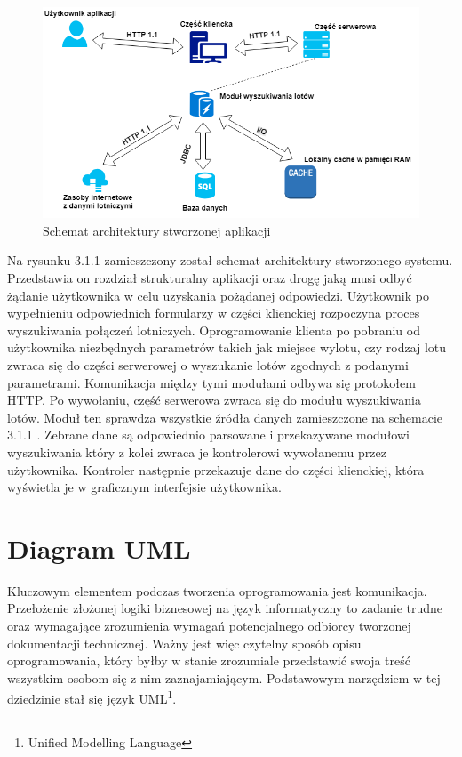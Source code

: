 \documentclass[12pt, twoside]{report}
\begin{document}
\begin{figure}[!ht]
\centering
\includegraphics[scale=0.60, keepaspectratio]{architecure_diagram.png}
\caption{Schemat architektury stworzonej aplikacji}
\label{fig:architecure_diagram}
\end{figure}

\newpage
Na rysunku 3.1.1 zamieszczony został schemat architektury stworzonego systemu. Przedstawia on rozdział strukturalny aplikacji oraz drogę jaką musi odbyć żądanie użytkownika w celu uzyskania pożądanej odpowiedzi. Użytkownik po wypełnieniu odpowiednich formularzy w części klienckiej rozpoczyna proces wyszukiwania połączeń lotniczych. Oprogramowanie klienta po pobraniu od użytkownika niezbędnych parametrów takich jak miejsce wylotu, czy rodzaj lotu zwraca się do części serwerowej o wyszukanie lotów zgodnych z podanymi parametrami. Komunikacja między tymi modułami odbywa się protokołem HTTP. Po wywołaniu, część serwerowa zwraca się do modułu wyszukiwania lotów. Moduł ten sprawdza wszystkie źródła danych zamieszczone na schemacie 3.1.1 . Zebrane dane są odpowiednio parsowane i przekazywane modułowi wyszukiwania który z kolei zwraca je kontrolerowi wywołanemu przez użytkownika. Kontroler następnie przekazuje dane do części klienckiej, która wyświetla je w  graficznym interfejsie użytkownika. 
\section{Diagram UML}
Kluczowym elementem podczas tworzenia oprogramowania jest komunikacja. Przełożenie złożonej logiki biznesowej na język informatyczny to zadanie trudne oraz wymagające zrozumienia wymagań potencjalnego odbiorcy tworzonej dokumentacji technicznej. Ważny jest więc czytelny sposób opisu oprogramowania, który byłby w stanie zrozumiale przedstawić swoja treść wszystkim osobom się z nim zaznajamiającym\cite{uml}. Podstawowym narzędziem w tej dziedzinie stał się język UML\footnote{Unified Modelling Language}. \\
\end{document}
